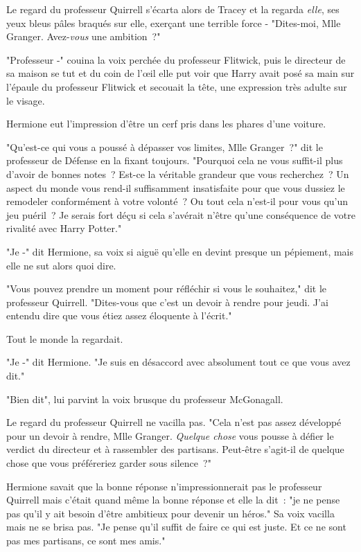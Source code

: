 Le regard du professeur Quirrell s'écarta alors de Tracey et la regarda \emph{elle}, ses yeux bleus pâles braqués sur elle, exerçant une terrible force - "Dites-moi, Mlle Granger. Avez-\emph{vous} une ambition~?"

"Professeur -" couina la voix perchée du professeur Flitwick, puis le directeur de sa maison se tut et du coin de l'œil elle put voir que Harry avait posé sa main sur l'épaule du professeur Flitwick et secouait la tête, une expression très adulte sur le visage.

Hermione eut l'impression d'être un cerf pris dans les phares d'une voiture.

"Qu'est-ce qui vous a poussé à dépasser vos limites, Mlle Granger~?" dit le professeur de Défense en la fixant toujours. "Pourquoi cela ne vous suffit-il plus d'avoir de bonnes notes~? Est-ce la véritable grandeur que vous recherchez~? Un aspect du monde vous rend-il suffisamment insatisfaite pour que vous dussiez le remodeler conformément à votre volonté~? Ou tout cela n'est-il pour vous qu'un jeu puéril~? Je serais fort déçu si cela s'avérait n'être qu'une conséquence de votre rivalité avec Harry Potter."

"Je -" dit Hermione, sa voix si aiguë qu'elle en devint presque un pépiement, mais elle ne sut alors quoi dire.

"Vous pouvez prendre un moment pour réfléchir si vous le souhaitez," dit le professeur Quirrell. "Dites-vous que c'est un devoir à rendre pour jeudi. J'ai entendu dire que vous étiez assez éloquente à l'écrit."

Tout le monde la regardait.

"Je -" dit Hermione. "Je suis en désaccord avec absolument tout ce que vous avez dit."

"Bien dit", lui parvint la voix brusque du professeur McGonagall.

Le regard du professeur Quirrell ne vacilla pas. "Cela n'est pas assez développé pour un devoir à rendre, Mlle Granger. \emph{Quelque chose} vous pousse à défier le verdict du directeur et à rassembler des partisans. Peut-être s'agit-il de quelque chose que vous préféreriez garder sous silence~?"

Hermione savait que la bonne réponse n'impressionnerait pas le professeur Quirrell mais c'était quand même la bonne réponse et elle la dit~: "je ne pense pas qu'il y ait besoin d'être ambitieux pour devenir un héros." Sa voix vacilla mais ne se brisa pas. "Je pense qu'il suffit de faire ce qui est juste. Et ce ne sont pas mes partisans, ce sont mes amis."

